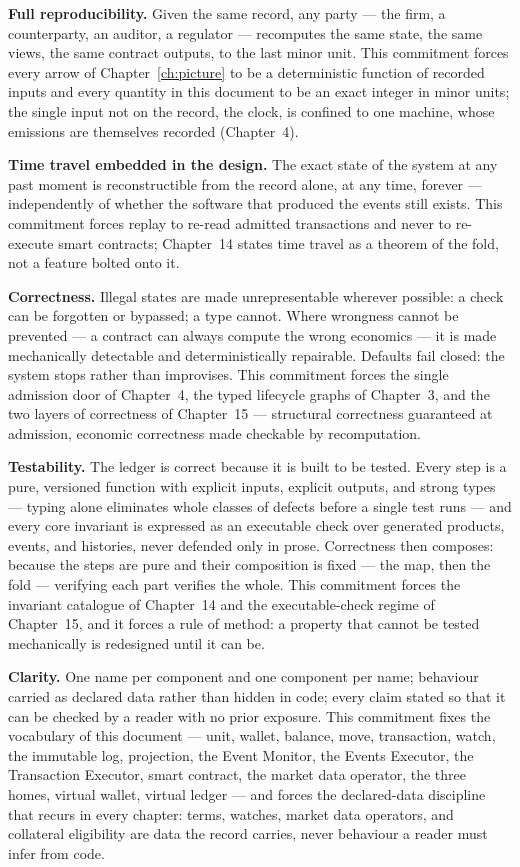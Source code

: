 \textbf{Full reproducibility.} Given the same record, any party --- the firm, a
counterparty, an auditor, a regulator --- recomputes the same state, the same views,
the same contract outputs, to the last minor unit. This commitment forces every arrow
of Chapter~\ref{ch:picture} to be a deterministic function of recorded inputs and
every quantity in this document to be an exact integer in minor units; the single
input not on the record, the clock, is confined to one machine, whose emissions are
themselves recorded (Chapter~4).

\textbf{Time travel embedded in the design.} The exact state of the system at any past
moment is reconstructible from the record alone, at any time, forever ---
independently of whether the software that produced the events still exists. This
commitment forces replay to re-read admitted transactions and never to re-execute
smart contracts; Chapter~14 states time travel as a theorem of the fold, not a feature
bolted onto it.

\textbf{Correctness.} Illegal states are made unrepresentable wherever possible: a
check can be forgotten or bypassed; a type cannot. Where wrongness cannot be prevented
--- a contract can always compute the wrong economics --- it is made mechanically
detectable and deterministically repairable. Defaults fail closed: the system stops
rather than improvises. This commitment forces the single admission door of
Chapter~4, the typed lifecycle graphs of Chapter~3, and the two layers of correctness
of Chapter~15 --- structural correctness guaranteed at admission, economic correctness
made checkable by recomputation.

\textbf{Testability.} The ledger is correct because it is built to be tested. Every
step is a pure, versioned function with explicit inputs, explicit outputs, and strong
types --- typing alone eliminates whole classes of defects before a single test runs
--- and every core invariant is expressed as an executable check over generated
products, events, and histories, never defended only in prose. Correctness then
composes: because the steps are pure and their composition is fixed --- the map, then
the fold --- verifying each part verifies the whole. This commitment forces the
invariant catalogue of Chapter~14 and the executable-check regime of Chapter~15, and
it forces a rule of method: a property that cannot be tested mechanically is
redesigned until it can be.

\textbf{Clarity.} One name per component and one component per name; behaviour carried
as declared data rather than hidden in code; every claim stated so that it can be
checked by a reader with no prior exposure. This commitment fixes the vocabulary of
this document --- unit, wallet, balance, move, transaction, watch, the immutable log,
projection, the Event Monitor, the Events Executor, the Transaction Executor, smart
contract, the market data operator, the three homes, virtual wallet, virtual ledger
--- and forces the declared-data discipline that recurs in every chapter: terms,
watches, market data operators, and collateral eligibility are data the record
carries, never behaviour a reader must infer from code.

